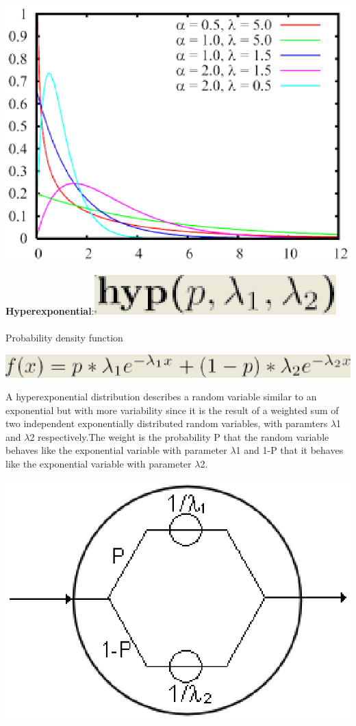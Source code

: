 \begin{center}
\includegraphics[scale=.5]{img/jsim/gamma_pdf.eps}
\end{center}
\textbf{Hyperexponential}:\includegraphics[scale=.5]{img/jsim/huperexpon_f.eps}\\\\
Probability density function\\
\begin{center}
\includegraphics[scale=.5]{img/jsim/huperexpon1.eps}
\end{center}
A hyperexponential distribution describes a random  variable similar to an exponential but with more variability since it is the result of a weighted sum of two independent exponentially distributed  random variables, with paramters $\lambda$1 and $\lambda$2 respectively.The weight is the probability P that the random variable behaves like the exponential variable with parameter $\lambda$1 and 1-P that it behaves like the exponential variable with parameter $\lambda$2.\\
\begin{center}
\includegraphics[scale=.5]{img/jsim/hyperExp1.eps}
\end{center}
